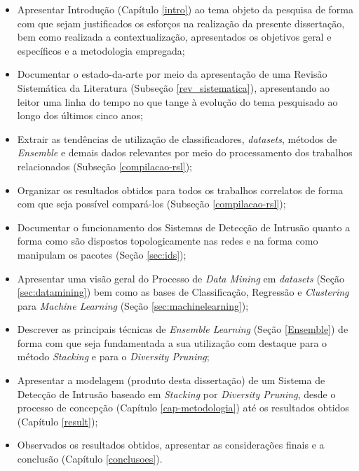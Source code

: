 \begin{itemize}

\item Apresentar Introdução (Capítulo \ref{intro}) ao tema objeto da pesquisa de forma com que sejam justificados os esforços na realização da presente dissertação, bem como realizada a contextualização, apresentados os objetivos geral e específicos e a metodologia empregada;

\item Documentar o estado-da-arte por meio da apresentação de uma Revisão Sistemática da Literatura (Subseção \ref{rev_sistematica}), apresentando ao leitor uma linha do tempo no que tange à evolução do tema pesquisado ao longo dos últimos cinco anos;

\item Extrair as tendências de utilização de classificadores, \textit{datasets}, métodos de \textit{Ensemble} e demais dados relevantes por meio do processamento dos trabalhos relacionados (Subseção \ref{compilacao-rsl});

\item Organizar os resultados obtidos para todos os trabalhos correlatos de forma com que seja possível compará-los (Subseção \ref{compilacao-rsl});

\item Documentar o funcionamento dos Sistemas de Detecção de Intrusão quanto a forma como são dispostos topologicamente nas redes e na forma como manipulam os pacotes (Seção \ref{sec:ids});

\item Apresentar uma visão geral do Processo de \textit{Data Mining} em \textit{datasets} (Seção \ref{sec:datamining}) bem como as bases de Classificação, Regressão e \textit{Clustering} para \textit{Machine Learning} (Seção \ref{sec:machinelearning});

\item Descrever as principais técnicas de \textit{Ensemble Learning} (Seção \ref{Ensemble}) de forma com que seja fundamentada a sua utilização com destaque para o método \textit{Stacking} e para o \textit{Diversity Pruning};

\item Apresentar a modelagem (produto desta dissertação) de um Sistema de Detecção de Intrusão baseado em \textit{Stacking} por \textit{Diversity Pruning}, desde o processo de concepção (Capítulo \ref{cap-metodologia}) até os resultados obtidos (Capítulo \ref{result});

\item Observados os resultados obtidos, apresentar as considerações finais e a conclusão (Capítulo \ref{conclusoes}).


\end{itemize}


